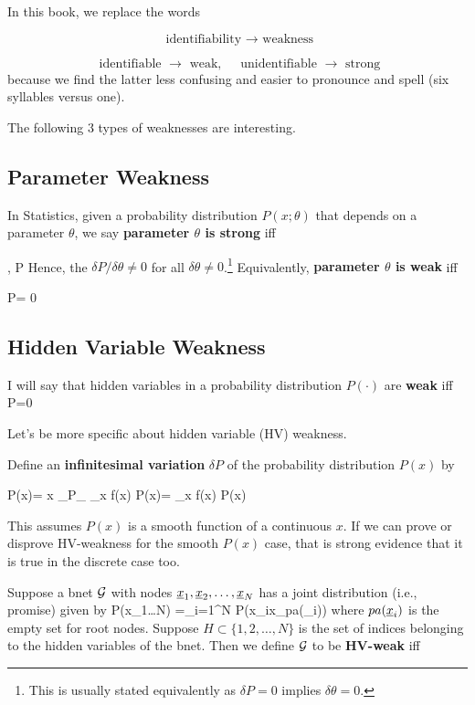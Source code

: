 In this book,
we  
replace 
the words

$$\text{ identifiability }
\to \text{ weakness}
$$

$$\text{ identifiable }
\to \text{ weak},\quad
\text{ unidentifiable }
\to \text{ strong}
$$
because we find 
the latter 
less confusing
and easier to 
pronounce and 
spell (six syllables versus one).

The following
3 types of weaknesses
are
interesting.

\subsection{Parameter Weakness}
In Statistics, given a probability distribution
$P(x;\theta)$ that depends on a parameter $\theta$, 
we say  {\bf parameter $\theta$ is strong} iff

\beq
\forall\; \delta\theta {},\quad \quad
\delta P 
\eeq
Hence, the  $\delta P/\delta \theta \neq 0$
for all $\delta\theta\neq 0$.\footnote{
This is usually stated equivalently as
$\delta P=0$ implies $\delta\theta=0$.} Equivalently, {\bf parameter $\theta$ is 
weak}
 iff

\beq\exists \;\delta\theta{}
\quad\quad \delta P= 0
\eeq

\subsection{Hidden Variable Weakness}

I will say that hidden variables
in a probability 
distribution $P(\cdot)$
are {\bf weak} iff
\beq
\exists {}\quad\quad
\delta P=0
\eeq

Let's be more specific about
hidden variable (HV)
weakness.


Define an
{\bf infinitesimal variation }
$\delta P$ of the
 probability distribution $P(x)$ by

\beq
\delta P(x)=
\delta x\; 
\eeq
\beq
\delta_{P_\rvx} \sum_x f(x) P(x)= \sum_x f(x) \delta P(x)
\eeq

This assumes $P(x)$
is a smooth function of
a continuous  $x$.
If we can prove or
disprove HV-weakness
for the smooth $P(x)$ case,
that is strong evidence that
it is true in the discrete case too.


Suppose a bnet ${\cal G}$ with nodes 
$\rvx_1, \rvx_2, \ldots, \rvx_N$ has a joint 
distribution (i.e., promise)
given by
\beq
P(x_{1\dots N})
=\prod_{i=1}^N P(x_i\mid x_{pa(\rvx_i)})
\eeq
where $pa(\rvx_i)$ is the empty set for root nodes.
Suppose $H\subset \{1, 2, \ldots, N\}$ is the set of indices belonging to the
hidden variables of the bnet.
Then we define ${\cal G}$  
to be {\bf HV-weak} iff


